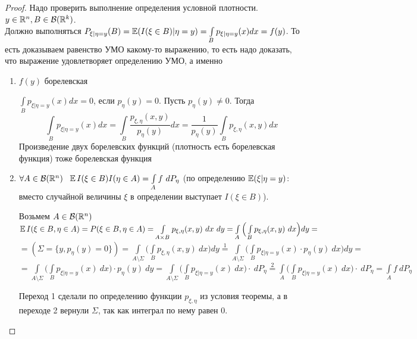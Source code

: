 \begin{proof}
    Надо проверить выполнение определения условной плотности. $y \in \mathbb{R}^n, B \in \mathcal{B}(\mathbb{R}^k)$.\\ Должно выполняться $P_{\xi|\eta = y}(B) = \operatorname{\mathbb{E}}(I(\xi \in B)|\eta = y) = \int\limits_{B}p_{\xi|\eta = y}(x)dx = f(y)$. То есть доказываем равенство УМО какому-то выражению, то есть надо доказать, что выражение удовлетворяет определению УМО, а именно  
    \begin{enumerate}
        \item $f(y)$ борелевская
        
        $\int\limits_{B}p_{\xi|\eta = y}(x)dx = 0$, если $p_\eta(y) = 0$. Пусть $p_\eta(y) \ne 0$. Тогда 
        \[ \int\limits_{B}p_{\xi|\eta = y}(x)dx = \int\limits_{B} \frac{p_{\xi, \eta}(x, y)}{p_\eta(y)} dx = \frac{1}{p_\eta(y)} \int\limits_{B} p_{\xi, \eta}(x, y) dx \] 
        Произведение двух борелевских функций (плотность есть борелевская функция) тоже борелевская функция 
        
        \item $\forall A \in \mathcal{B}(\R^n) \ \  \E I(\xi \in B) I(\eta \in A) = \int\limits_A f\ dP_\eta$ (по определению $\operatorname{\mathbb{E}}(\xi|\eta=y)$: вместо случайной величины $\xi$ в определении выступает $I(\xi \in B)$).
        
        Возьмем $A \in \mathcal{B}(\mathbb{R}^n)$ \\
        $\operatorname{\mathbb{E}} I(\xi \in B, \eta \in A) = P(\xi \in B, \eta \in A) = \int\limits_{A \times B} p_{\xi, \eta}(x, y) \ dx\ dy = \int\limits_{A} \Big ( \int\limits_{B}p_{\xi, \eta}(x, y) \ dx \Big ) dy =$ \\ $ =(\Sigma = \{ y, p_\eta(y) = 0 \} )= \int\limits_{A \setminus \Sigma} \Big ( \int\limits_{B}p_{\xi, \eta}(x, y) \ dx \Big ) dy \stackrel{1}{=} 
        \int\limits_{A \setminus \Sigma} \Big ( \int\limits_{B}p_{\xi| \eta = y}(x) \cdot p_{\eta}(y) \ dx \Big ) dy  =$ \\ $= \int\limits_{A \setminus \Sigma} \Big ( \int\limits_{B}p_{\xi| \eta = y}(x)\ dx \Big ) \cdot p_{\eta}(y) \ dy = \int\limits_{A \setminus \Sigma} \Big ( \int\limits_{B}p_{\xi| \eta = y}(x)\ dx \Big ) \cdot \ dP_\eta \stackrel{2}{=} \int\limits_{A} \Big ( \int\limits_{B}p_{\xi| \eta = y}(x)\ dx \Big ) \cdot \ dP_\eta = \int\limits_{A} f \ dP_\eta $
        
        Переход 1 сделали по определению функции $p_{\xi, \eta}$ из условия теоремы, а в переходе 2 вернули $\Sigma$, так как интеграл по нему равен 0.
    \end{enumerate}
\end{proof} 